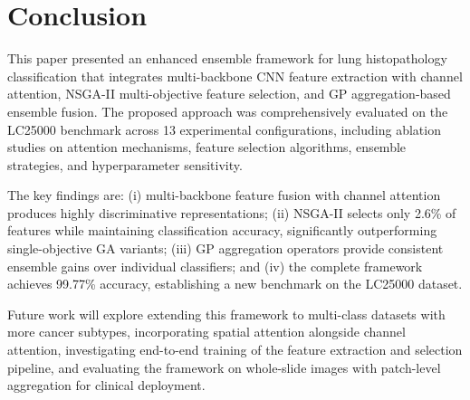 \documentclass{article}
\begin{document}
\section{Conclusion}

This paper presented an enhanced ensemble framework for lung histopathology classification that integrates multi-backbone CNN feature extraction with channel attention, NSGA-II multi-objective feature selection, and GP aggregation-based ensemble fusion. The proposed approach was comprehensively evaluated on the LC25000 benchmark across 13 experimental configurations, including ablation studies on attention mechanisms, feature selection algorithms, ensemble strategies, and hyperparameter sensitivity.

The key findings are: (i) multi-backbone feature fusion with channel attention produces highly discriminative representations; (ii) NSGA-II selects only 2.6\% of features while maintaining classification accuracy, significantly outperforming single-objective GA variants; (iii) GP aggregation operators provide consistent ensemble gains over individual classifiers; and (iv) the complete framework achieves 99.77\% accuracy, establishing a new benchmark on the LC25000 dataset.

Future work will explore extending this framework to multi-class datasets with more cancer subtypes, incorporating spatial attention alongside channel attention, investigating end-to-end training of the feature extraction and selection pipeline, and evaluating the framework on whole-slide images with patch-level aggregation for clinical deployment.



\end{document}
